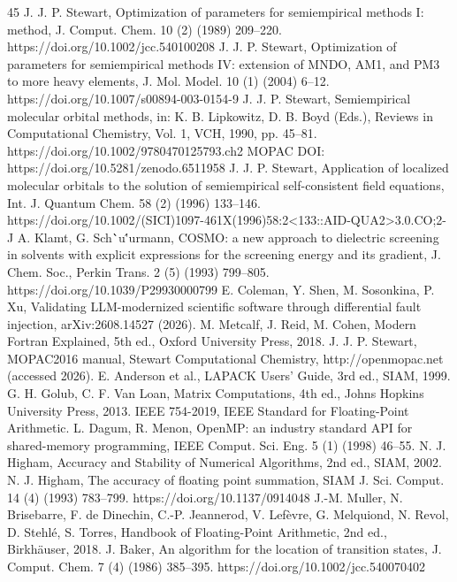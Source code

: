 \documentclass[preprint,12pt]{elsarticle}
\begin{document}
\begin{thebibliography}{45}
 J. J. P. Stewart, Optimization of parameters for semiempirical methods I: method, J. Comput. Chem. 10 (2) (1989) 209--220. https://doi.org/10.1002/jcc.540100208
 J. J. P. Stewart, Optimization of parameters for semiempirical methods IV: extension of MNDO, AM1, and PM3 to more heavy elements, J. Mol. Model. 10 (1) (2004) 6--12. https://doi.org/10.1007/s00894-003-0154-9
 J. J. P. Stewart, Semiempirical molecular orbital methods, in: K. B. Lipkowitz, D. B. Boyd (Eds.), Reviews in Computational Chemistry, Vol. 1, VCH, 1990, pp. 45--81. https://doi.org/10.1002/9780470125793.ch2
 MOPAC DOI: https://doi.org/10.5281/zenodo.6511958
 J. J. P. Stewart, Application of localized molecular orbitals to the solution of semiempirical self-consistent field equations, Int. J. Quantum Chem. 58 (2) (1996) 133--146. https://doi.org/10.1002/(SICI)1097-461X(1996)58:2<133::AID-QUA2>3.0.CO;2-J
 A. Klamt, G. Sch\``{u}\''{u}rmann, COSMO: a new approach to dielectric screening in solvents with explicit expressions for the screening energy and its gradient, J. Chem. Soc., Perkin Trans. 2 (5) (1993) 799--805. https://doi.org/10.1039/P29930000799
 E. Coleman, Y. Shen, M. Sosonkina, P. Xu, Validating LLM-modernized scientific software through differential fault injection, arXiv:2608.14527 (2026).
 M. Metcalf, J. Reid, M. Cohen, Modern Fortran Explained, 5th ed., Oxford University Press, 2018.
 J. J. P. Stewart, MOPAC2016 manual, Stewart Computational Chemistry, http://openmopac.net (accessed 2026).
 E. Anderson et al., LAPACK Users' Guide, 3rd ed., SIAM, 1999.
 G. H. Golub, C. F. Van Loan, Matrix Computations, 4th ed., Johns Hopkins University Press, 2013.
 IEEE 754-2019, IEEE Standard for Floating-Point Arithmetic.
 L. Dagum, R. Menon, OpenMP: an industry standard API for shared-memory programming, IEEE Comput. Sci. Eng. 5 (1) (1998) 46--55.
 N. J. Higham, Accuracy and Stability of Numerical Algorithms, 2nd ed., SIAM, 2002.
 N. J. Higham, The accuracy of floating point summation, SIAM J. Sci. Comput. 14 (4) (1993) 783--799. https://doi.org/10.1137/0914048
 J.-M. Muller, N. Brisebarre, F. de Dinechin, C.-P. Jeannerod, V. Lef\`evre, G. Melquiond, N. Revol, D. Stehl\'e, S. Torres, Handbook of Floating-Point Arithmetic, 2nd ed., Birkh\"{a}user, 2018.
 J. Baker, An algorithm for the location of transition states, J. Comput. Chem. 7 (4) (1986) 385--395. https://doi.org/10.1002/jcc.540070402

\end{thebibliography}
\end{document}

